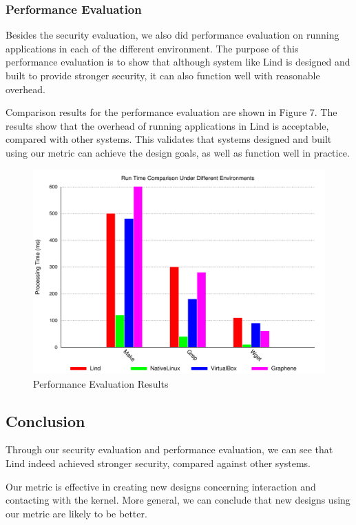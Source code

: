 \subsubsection{Performance Evaluation}
Besides the security evaluation, we also did performance evaluation on running applications in each of the different environment.
The purpose of this performance evaluation is to show that although system like Lind is designed and built to provide stronger
security, it can also function well with reasonable overhead. 

Comparison results for the performance evaluation are shown in Figure 7.
The results show that the overhead of running applications in Lind is acceptable, compared with other systems. 
This validates that systems designed and built using our metric can achieve the design goals, as well as function well in practice. 

\begin{figure}[h]
\centering
\includegraphics[width=1.0\columnwidth]{diagram/lind_ccs15_diagram_05.pdf}
\caption{Performance Evaluation Results}
\label{fig:performance_evaluation_results}
\end{figure}

\subsection{Conclusion}
Through our security evaluation and performance evaluation, we can see that 
Lind indeed achieved stronger security, compared against other systems.

Our metric is effective in creating new designs concerning interaction and contacting with the kernel. 
More general, we can conclude that new designs using our metric are likely to be better. 